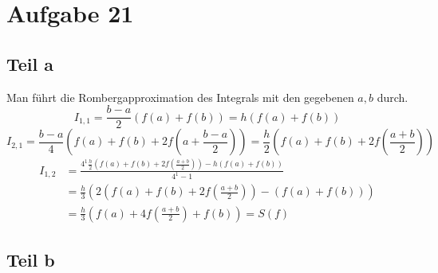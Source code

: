 \documentclass[10pt,a4paper]{article}
\begin{document}
\section{Aufgabe 21}

\subsection{Teil a}

Man führt die Rombergapproximation des Integrals mit den gegebenen $a, b$ durch.
\begin{equation}
  I_{1, 1} = \frac{b - a}{2}(f(a) + f(b)) = h(f(a) + f(b))
\end{equation}
\begin{equation}
  I_{2, 1} = \frac{b - a}{4}(f(a) + f(b) + 2f(a + \frac{b - a}{2})) = \frac{h}{2}(f(a) + f(b) + 2f(\frac{a + b}{2}))
\end{equation}
\begin{align*}
  I_{1, 2} & = \frac{4^{1}\frac{h}{2}(f(a) + f(b) + 2f(\frac{a + b}{2})) - h(f(a) + f(b))}{4^{1} - 1}\\
  & = \frac{h}{3}\left (2(f(a) + f(b) + 2f(\frac{a + b}{2})) - (f(a) + f(b)) \right)\\
  & = \frac{h}{3} \left( f(a) + 4f\left(\frac{a + b}{2}\right) + f(b) \right) = S(f)
\end{align*}

\subsection{Teil b}
\end{document}
